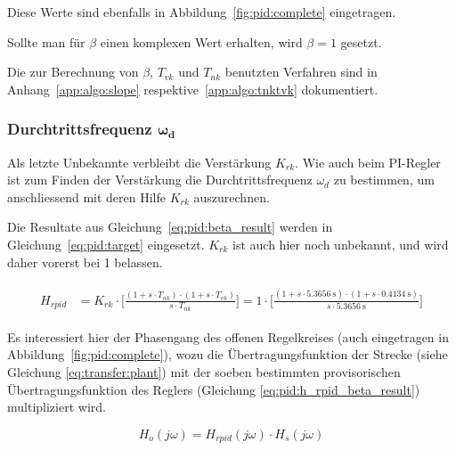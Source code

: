 Diese Werte sind ebenfalls in Abbildung~\ref{fig:pid:complete} eingetragen.

Sollte  man  f\"ur  $\beta$  einen komplexen  Wert  erhalten,  wird  $\beta=1$
gesetzt.

Die zur Berechnung von $\beta$, $T_{vk}$ und $T_{nk}$ benutzten Verfahren sind
in Anhang~\ref{app:algo:slope} respektive~\ref{app:algo:tnktvk} dokumentiert.


\subsubsection{Durchtrittsfrequenz $\mathbf{\boldsymbol{\omega}_d}$}

Als  letzte Unbekannte  verbleibt  die Verst\"arkung  $K_{rk}$. Wie auch  beim
PI-Regler ist zum Finden  der Verst\"arkung die Durchtrittsfrequenz $\omega_d$
zu bestimmen, um anschliessend mit deren Hilfe $K_{rk}$ auszurechnen.

Die    Resultate    aus     Gleichung~\ref{eq:pid:beta_result}    werden    in
Gleichung~\ref{eq:pid:target}   eingesetzt. $K_{rk}$   ist  auch   hier   noch
unbekannt, und wird daher vorerst bei 1 belassen.

\begin{gather} \label{eq:pid:h_rpid_beta_result}
    \begin{split}
        H_{rpid} & = K_{rk} \cdot \biggl[ \frac{(1 + s \cdot T_{nk}               ) \cdot (1 + s \cdot T_{vk}               ) }{ s \cdot T_{nk}               } \biggr]
                   = 1      \cdot \biggl[ \frac{(1 + s \cdot \SI{5.3656}{\second} ) \cdot (1 + s \cdot \SI{0.4134}{\second} ) }{ s \cdot \SI{5.3656}{\second} } \biggr]
    \end{split}
\end{gather}


Es interessiert hier der Phasengang des offenen Regelkreises (auch eingetragen
in   Abbildung~\ref{fig:pid:complete}),    wozu   die   \"Ubertragungsfunktion
der  Strecke   (siehe  Gleichung   \ref{eq:transfer:plant})  mit   der  soeben
bestimmten  provisorischen   \"Ubertragungsfunktion  des   Reglers  (Gleichung
\ref{eq:pid:h_rpid_beta_result}) multipliziert wird.

\begin{equation} \label{eq:pid:h_o_k_rk_one}
    H_{o}(j\omega) = H_{rpid}(j\omega) \cdot H_s(j\omega)
\end{equation}

